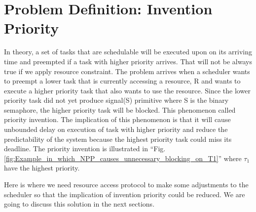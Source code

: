 \section{Problem Definition: Invention Priority}

In theory, a set of tasks that are schedulable will be executed upon on its arriving time and preempted if a task with higher priority arrives. That will not be always true if we apply resource constraint. The problem arrives when a scheduler wants to preempt a lower task that is currently accessing a  resource, R and wants to execute a higher priority task that also wants to use the resource. Since the lower priority task did not yet produce signal(S) primitive where S is the binary semaphore, the higher priority task will be blocked. This phenomenon called priority invention. The implication of this phenomenon is that it will cause unbounded delay on execution of task with higher priority and reduce the predictability of the system because the highest priority task could miss its deadline. The priority invention is illustrated in ``Fig. \ref{fig:Example_in_which_NPP_causes_unnecessary_blocking_on_T1}'' where $ \tau_{1} $ have the highest priority.

Here is where we need resource access protocol to make some adjustments to the scheduler so that the implication of invention priority could be reduced. We are going to discuss this solution in the next sections.